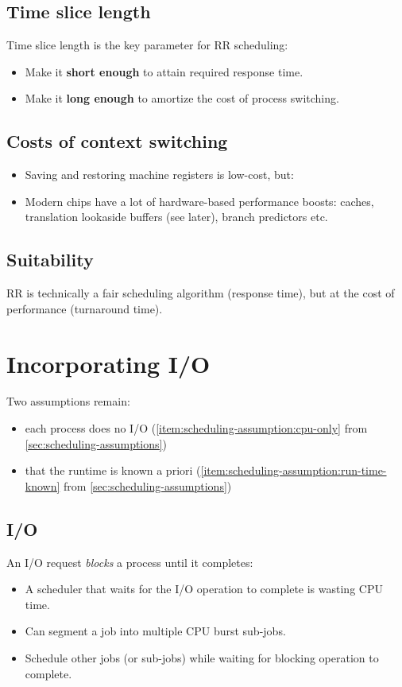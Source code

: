 \subsection{Time slice length}

Time slice length is the key parameter for RR scheduling:
\begin{itemize}
\item Make it \textbf{short enough} to attain required response time.
\item Make it \textbf{long enough} to amortize the cost of process switching.
\end{itemize}

\subsection{Costs of context switching}

\begin{itemize}
\item Saving and restoring machine registers is low-cost, but:
\item Modern chips have a lot of hardware-based performance boosts: caches, translation lookaside buffers (see later), branch predictors etc.
\end{itemize}

\subsection{Suitability}

RR is technically a fair scheduling algorithm (response time), but at the cost of performance (turnaround time).

\section{Incorporating I/O}

Two assumptions remain:
\begin{itemize}
\item each process does no I/O (\ref{item:scheduling-assumption:cpu-only} from \autoref{sec:scheduling-assumptions})
\item that the runtime is known a priori (\ref{item:scheduling-assumption:run-time-known} from \autoref{sec:scheduling-assumptions})
\end{itemize}

\subsection{I/O}

An I/O request \textit{blocks} a process until it completes:
\begin{itemize}
\item A scheduler that waits for the I/O operation to complete is wasting CPU time.
\item Can segment a job into multiple CPU burst sub-jobs.
\item Schedule other jobs (or sub-jobs) while waiting for blocking operation to complete.
\end{itemize}




